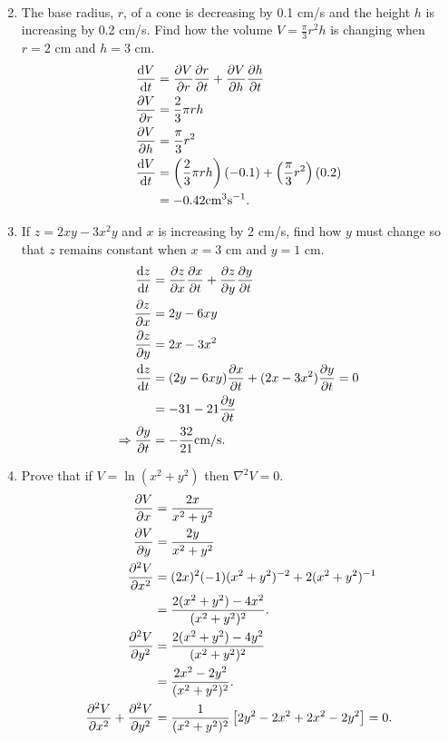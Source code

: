 \documentclass{article}
\begin{document}
\begin{enumerate}
{\begin{align*}
		\end{align*}
	}
	\item{The base radius, $r$, of a cone is decreasing by 0.1 cm/s and the height $h$ is increasing by 0.2 cm/s.  Find how the volume $V = \frac{\pi}{3} r^2 h$ is changing when $r = 2$ cm and $h = 3$ cm.
		\begin{align*}
			\dv{V}{t} &= \pdv{V}{r} \pdv{r}{t} + \pdv{V}{h} \pdv{h}{t} \\
			\pdv{V}{r} &= \frac{2}{3} \pi r h \\
			\pdv{V}{h} &= \frac{\pi}{3} r^2 \\
			\dv{V}{t} &= \left( \frac{2}{3} \pi r h \right) (-0.1) + \left( \frac{\pi}{3} r^2 \right) (0.2) \\
			&= -0.42 {\rm cm}^3 {\rm s}^{-1} .
		\end{align*}
	}
	\item{If $z = 2xy - 3x^2 y$ and $x$ is increasing by 2 cm/s, find how $y$ must change so that $z$ remains constant when $x = 3$ cm and $y = 1$ cm.
		\begin{align*}
			\dv{z}{t} &= \pdv{z}{x} \pdv{x}{t} + \pdv{z}{y} \pdv{y}{t} \\
			\pdv{z}{x} &= 2y - 6 xy \\
			\pdv{z}{y} &= 2x - 3x^2 \\
			\dv{z}{t} &= (2y - 6 xy) \pdv{x}{t} + (2x - 3x^2) \pdv{y}{t} = 0 \\
			&= -31 - 21 \pdv{y}{t} \\
			\Rightarrow \pdv{y}{t} &= -\frac{32}{21} {\rm cm/s} .
		\end{align*}			
	}
	\item{Prove that if $V = \ln (x^2 + y^2)$ then $\nabla^2 V = 0$.
		\begin{align*}
			\pdv{V}{x} &= \frac{2x}{x^2 + y^2} \\
			\pdv{V}{y} &= \frac{2y}{x^2 + y^2} \\
			\pdv[2]{V}{x} &= (2x)^2 (-1) (x^2 + y^2)^{-2} + 2(x^2 + y^2)^{-1} \\
			&= \frac{2(x^2 + y^2) - 4x^2}{(x^2 + y^2)^2} . \\
			\pdv[2]{V}{y} &= \frac{2(x^2 + y^2) - 4y^2}{(x^2 + y^2)^2} \\
			&= \frac{2x^2 - 2y^2}{(x^2 + y^2)^2} . \\
			\pdv[2]{V}{x} + \pdv[2]{V}{y} &= \frac{1}{(x^2 + y^2)^2} \left[ 2y^2 - 2x^2 + 2x^2 - 2y^2 \right] = 0.
		\end{align*}			
	}
\end{enumerate}
\end{document}
